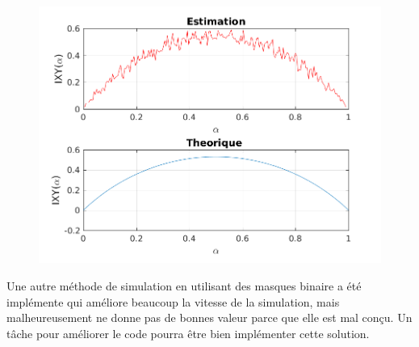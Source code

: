 \documentclass{report}
\begin{document}
\begin{figure}[h]
	\centering
	\captionsetup{justification=centering}
	\includegraphics[width=0.7\linewidth]{../canal23}
	\caption{}
	\label{fig:}
\end{figure}
Une autre méthode de simulation en utilisant des masques binaire a été implémente qui améliore beaucoup
la vitesse de la simulation, mais malheureusement ne donne pas de bonnes valeur parce que elle est mal conçu. Un tâche pour améliorer le code pourra être bien implémenter cette solution.

\end{document}

